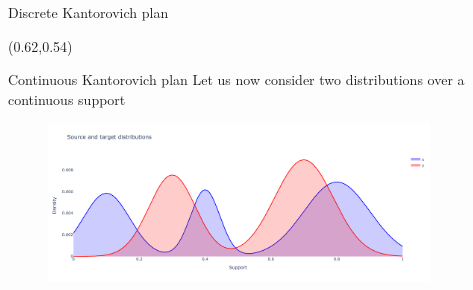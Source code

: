 \documentclass[pdf,aspectratio=169,10pt]{beamer}
\begin{document}
\begin{frame}{ Discrete Kantorovich plan}
\begin{textblock}{0.45} (0.62,0.54)
\small
{}
\end{textblock}
\end{frame}






\begin{frame}{ Continuous Kantorovich plan}
    Let us now consider two  distributions over a continuous support
\begin{minipage}{0.59\textwidth}
\begin{figure}
    \centering
        \includegraphics[width=0.9\textwidth]{../img/kantorovich_continuous_density.pdf}\hspace{2em}
    \end{figure}


\end{minipage}
\end{frame}
\end{document}
